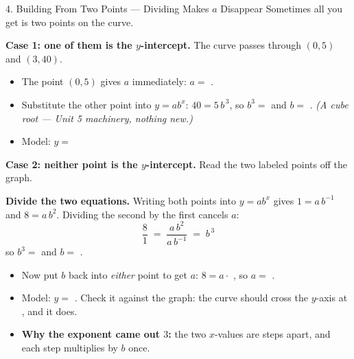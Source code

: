 \documentclass[10pt]{article}
\newcommand{\lgrid}[4]{%
  \draw[step=1, linegray!40, very thin] (#1,#3) grid (#2,#4);
  \draw[->, semithick, charcoal] (#1,0)--(#2,0) node[below right, font=\scriptsize]{$x$};
  \draw[->, semithick, charcoal] (0,#3)--(0,#4) node[left, font=\scriptsize]{$y$};}
\newcommand{\expcurve}[4]{\draw[very thick, forest, domain=#3:#4, samples=120, smooth]
  plot (\x,{#1*exp((#2)*(\x))});}
\begin{document}
\begin{notesbox}{4. Building From Two Points --- Dividing Makes $a$ Disappear}
Sometimes all you get is two points on the curve.

\vspace{3pt}
\textbf{Case 1: one of them is the $y$-intercept.} The curve passes through $(0,5)$ and $(3,40)$.
\begin{itemize}[leftmargin=1.5em, itemsep=3pt]
  \item The point $(0,5)$ gives $a$ immediately: $a=$ .
  \item Substitute the other point into $y=ab^{x}$: \; $40 = 5\,b^{\,3}$, so $b^{3}=$
         and $b=$ . \;
        \emph{(A cube root --- Unit 5 machinery, nothing new.)}
  \item Model: $y=$ 
\end{itemize}

\vspace{4pt}
\textbf{Case 2: neither point is the $y$-intercept.} Read the two labeled points off the graph.
\begin{center}
\begin{minipage}[c]{0.46\linewidth}
\centering
{}
\end{minipage}
\begin{minipage}[c]{0.50\linewidth}
\small
\textbf{Divide the two equations.} Writing both points into $y=ab^{x}$ gives
$1=a\,b^{-1}$ and $8=a\,b^{2}$. Dividing the second by the first cancels $a$:
\[
  \frac{8}{1} \;=\; \frac{a\,b^{2}}{a\,b^{-1}} \;=\; b^{\,3}
\]
so $b^{3}=$  and $b=$ .
\end{minipage}
\end{center}
\begin{itemize}[leftmargin=1.5em, itemsep=3pt]
  \item Now put $b$ back into \emph{either} point to get $a$: \; $8=a\cdot$ , so
        $a=$ .
  \item Model: $y=$ . \; Check it against the graph: the curve should cross the
        $y$-axis at , and it does.
  \item \textbf{Why the exponent came out $3$:} the two $x$-values are  steps apart,
        and each step multiplies by $b$ once.
\end{itemize}
\end{notesbox}
\end{document}
